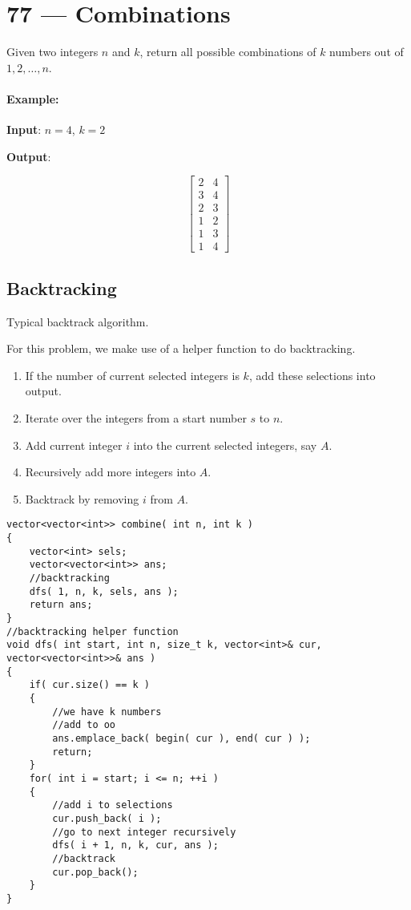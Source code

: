 \section{77 --- Combinations}
Given two integers $n$ and $k$, return all possible combinations of $k$ numbers out of $1, 2, \ldots, n$.

\paragraph{Example:}

\begin{flushleft}
\textbf{Input}: $n = 4$, $k = 2$

\textbf{Output}:

\[
\begin{bmatrix}
2 & 4\\
3 & 4\\
2 & 3\\
1 & 2\\
1 & 3\\
1 & 4
\end{bmatrix}
\]
\end{flushleft}

\subsection{Backtracking}
Typical backtrack algorithm.

For this problem, we make use of a helper function to do backtracking. 

\begin{enumerate}
\item If the number of current selected integers is $k$, add these selections into output.
\item Iterate over the integers from a start number $s$ to $n$.
\item Add current integer $i$ into the current selected integers, say $A$.
\item Recursively add more integers into $A$.
\item Backtrack by removing $i$ from $A$.
\end{enumerate}

\setcounter{lstlisting}{0}
\begin{lstlisting}[style=customc, caption={Backtracking}]
vector<vector<int>> combine( int n, int k )
{
    vector<int> sels;
    vector<vector<int>> ans;
    //backtracking
    dfs( 1, n, k, sels, ans );
    return ans;
}
//backtracking helper function
void dfs( int start, int n, size_t k, vector<int>& cur, vector<vector<int>>& ans )
{
    if( cur.size() == k )
    {
        //we have k numbers
        //add to oo
        ans.emplace_back( begin( cur ), end( cur ) );
        return;
    }
    for( int i = start; i <= n; ++i )
    {
        //add i to selections
        cur.push_back( i );
        //go to next integer recursively
        dfs( i + 1, n, k, cur, ans );
        //backtrack
        cur.pop_back();
    }
}
\end{lstlisting}